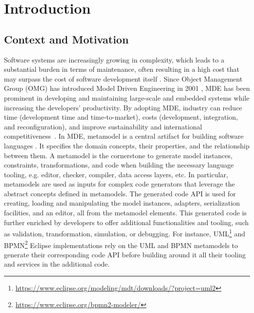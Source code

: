 \chapter{Introduction}
\label{introduction}



\section{Context and Motivation}
\label{introcontext}
Software systems are increasingly growing in complexity, which leads to a substantial burden in terms of maintenance, often resulting in a high cost that may surpass the cost of software development itself \cite{https://doi.org/10.1049/sfw2.12075}.
Since Object Management Group (OMG) has introduced Model Driven Engineering in 2001 \cite{brambilla2017model}, MDE has been prominent in developing and maintaining large-scale and embedded systems while increasing the developers' productivity. By adopting MDE, industry can reduce time (development time and time-to-market), costs (development, integration, and reconfiguration), and improve sustainability and international competitiveness~\cite{10.1145/1985793.1985858,liebel2014assessing,10.1145/1985793.1985882}. %
 In MDE, metamodel is a central artifact for building software languages \cite{cabot2012object}. It specifies the domain concepts, their properties, and the relationship between them.
A metamodel is the cornerstone to generate model instances, constraints, transformations, and code when building the necessary language tooling, e.g. editor, checker, compiler, data access layers, etc. 
In particular, metamodels are used as inputs for complex code generators that leverage the abstract concepts defined in metamodels. The generated code API is used for creating, loading and manipulating the model instances, adapters, serialization facilities, and an editor, all from the metamodel elements.
This generated code is further enriched by developers to offer additional functionalities and tooling, such as validation, transformation, simulation, or debugging.
For instance, UML\footnote{\url{https://www.eclipse.org/modeling/mdt/downloads/?project=uml2}}  and BPMN\footnote{\url{https://www.eclipse.org/bpmn2-modeler/}} Eclipse implementations rely on the UML and BPMN metamodels to generate their corresponding code API before building around it all their tooling and services in the additional code.
